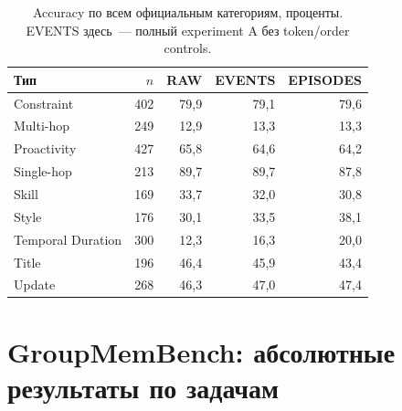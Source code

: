 \documentclass[11pt,a4paper]{article}
\begin{document}
\begin{table}[ht]
\centering\small
\begin{tabular}{lrrrr}
\toprule
Тип & $n$ & RAW & EVENTS & EPISODES\\
\midrule
Constraint & 402 & 79{,}9 & 79{,}1 & 79{,}6\\
Multi-hop & 249 & 12{,}9 & 13{,}3 & 13{,}3\\
Proactivity & 427 & 65{,}8 & 64{,}6 & 64{,}2\\
Single-hop & 213 & 89{,}7 & 89{,}7 & 87{,}8\\
Skill & 169 & 33{,}7 & 32{,}0 & 30{,}8\\
Style & 176 & 30{,}1 & 33{,}5 & 38{,}1\\
Temporal Duration & 300 & 12{,}3 & 16{,}3 & 20{,}0\\
Title & 196 & 46{,}4 & 45{,}9 & 43{,}4\\
Update & 268 & 46{,}3 & 47{,}0 & 47{,}4\\
\bottomrule
\end{tabular}
\caption{Accuracy по всем официальным категориям, проценты. EVENTS здесь~---
полный experiment A без token/order controls.}
\label{tab:ever-slices}
\end{table}

\section{GroupMemBench: абсолютные результаты по задачам}
\label{app:group-external}
\end{document}
